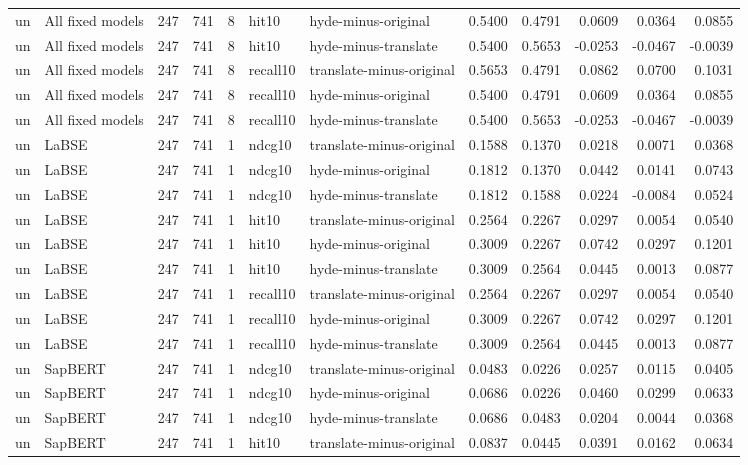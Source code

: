 \begin{tabular}{llrrrllrrrrr}
un & All fixed models & 247 & 741 & 8 & hit10 & hyde-minus-original & 0.5400 & 0.4791 & 0.0609 & 0.0364 & 0.0855 \\
un & All fixed models & 247 & 741 & 8 & hit10 & hyde-minus-translate & 0.5400 & 0.5653 & -0.0253 & -0.0467 & -0.0039 \\
un & All fixed models & 247 & 741 & 8 & recall10 & translate-minus-original & 0.5653 & 0.4791 & 0.0862 & 0.0700 & 0.1031 \\
un & All fixed models & 247 & 741 & 8 & recall10 & hyde-minus-original & 0.5400 & 0.4791 & 0.0609 & 0.0364 & 0.0855 \\
un & All fixed models & 247 & 741 & 8 & recall10 & hyde-minus-translate & 0.5400 & 0.5653 & -0.0253 & -0.0467 & -0.0039 \\
un & LaBSE & 247 & 741 & 1 & ndcg10 & translate-minus-original & 0.1588 & 0.1370 & 0.0218 & 0.0071 & 0.0368 \\
un & LaBSE & 247 & 741 & 1 & ndcg10 & hyde-minus-original & 0.1812 & 0.1370 & 0.0442 & 0.0141 & 0.0743 \\
un & LaBSE & 247 & 741 & 1 & ndcg10 & hyde-minus-translate & 0.1812 & 0.1588 & 0.0224 & -0.0084 & 0.0524 \\
un & LaBSE & 247 & 741 & 1 & hit10 & translate-minus-original & 0.2564 & 0.2267 & 0.0297 & 0.0054 & 0.0540 \\
un & LaBSE & 247 & 741 & 1 & hit10 & hyde-minus-original & 0.3009 & 0.2267 & 0.0742 & 0.0297 & 0.1201 \\
un & LaBSE & 247 & 741 & 1 & hit10 & hyde-minus-translate & 0.3009 & 0.2564 & 0.0445 & 0.0013 & 0.0877 \\
un & LaBSE & 247 & 741 & 1 & recall10 & translate-minus-original & 0.2564 & 0.2267 & 0.0297 & 0.0054 & 0.0540 \\
un & LaBSE & 247 & 741 & 1 & recall10 & hyde-minus-original & 0.3009 & 0.2267 & 0.0742 & 0.0297 & 0.1201 \\
un & LaBSE & 247 & 741 & 1 & recall10 & hyde-minus-translate & 0.3009 & 0.2564 & 0.0445 & 0.0013 & 0.0877 \\
un & SapBERT & 247 & 741 & 1 & ndcg10 & translate-minus-original & 0.0483 & 0.0226 & 0.0257 & 0.0115 & 0.0405 \\
un & SapBERT & 247 & 741 & 1 & ndcg10 & hyde-minus-original & 0.0686 & 0.0226 & 0.0460 & 0.0299 & 0.0633 \\
un & SapBERT & 247 & 741 & 1 & ndcg10 & hyde-minus-translate & 0.0686 & 0.0483 & 0.0204 & 0.0044 & 0.0368 \\
un & SapBERT & 247 & 741 & 1 & hit10 & translate-minus-original & 0.0837 & 0.0445 & 0.0391 & 0.0162 & 0.0634 \\

\end{tabular}
